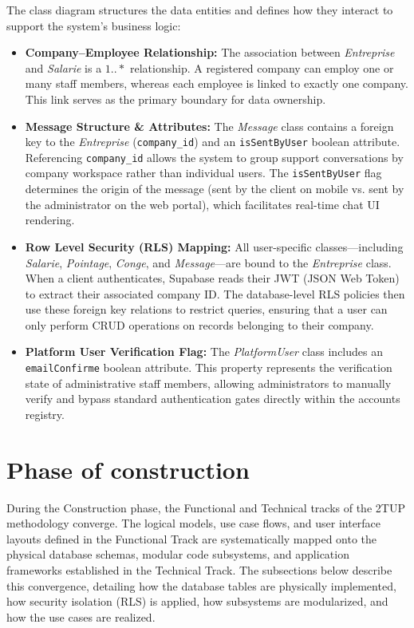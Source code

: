 The class diagram structures the data entities and defines how they interact to support the system's business logic:
\begin{itemize}
    \item \textbf{Company--Employee Relationship:} The association between \textit{Entreprise} and \textit{Salarie} is a $1..*$ relationship. A registered company can employ one or many staff members, whereas each employee is linked to exactly one company. This link serves as the primary boundary for data ownership.
    \item \textbf{Message Structure \& Attributes:} The \textit{Message} class contains a foreign key to the \textit{Entreprise} (\texttt{company\_id}) and an \texttt{isSentByUser} boolean attribute. Referencing \texttt{company\_id} allows the system to group support conversations by company workspace rather than individual users. The \texttt{isSentByUser} flag determines the origin of the message (sent by the client on mobile vs. sent by the administrator on the web portal), which facilitates real-time chat UI rendering.
    \item \textbf{Row Level Security (RLS) Mapping:} All user-specific classes—including \textit{Salarie}, \textit{Pointage}, \textit{Conge}, and \textit{Message}—are bound to the \textit{Entreprise} class. When a client authenticates, Supabase reads their JWT (JSON Web Token) to extract their associated company ID. The database-level RLS policies then use these foreign key relations to restrict queries, ensuring that a user can only perform CRUD operations on records belonging to their company.
    \item \textbf{Platform User Verification Flag:} The \textit{PlatformUser} class includes an \texttt{emailConfirme} boolean attribute. This property represents the verification state of administrative staff members, allowing administrators to manually verify and bypass standard authentication gates directly within the accounts registry.
\end{itemize}
\section{Phase of construction}

During the Construction phase, the Functional and Technical tracks of the 2TUP methodology converge. The logical models, use case flows, and user interface layouts defined in the Functional Track are systematically mapped onto the physical database schemas, modular code subsystems, and application frameworks established in the Technical Track. The subsections below describe this convergence, detailing how the database tables are physically implemented, how security isolation (RLS) is applied, how subsystems are modularized, and how the use cases are realized.

